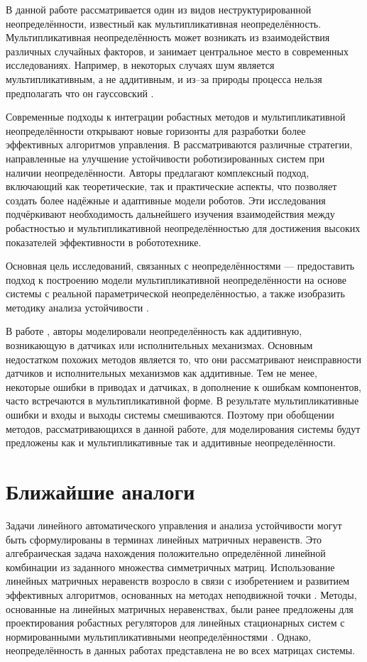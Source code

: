 В данной работе рассматривается один из видов неструктурированной неопределённости, известный как мультипликативная неопределённость. Мультипликативная неопределённость может возникать из взаимодействия различных случайных факторов, и занимает центральное место в современных исследованиях. Например, в некоторых случаях шум является мультипликативным, а не аддитивным, и из--за природы процесса нельзя предполагать что он гауссовский \cite{Bosse2016, Panza2015}.

Современные подходы к интеграции робастных методов и мультипликативной неопределённости открывают новые горизонты для разработки более эффективных алгоритмов управления. В \cite{Radek2017} рассматриваются различные стратегии, направленные на улучшение устойчивости роботизированных систем при наличии неопределённости. Авторы предлагают комплексный подход, включающий как теоретические, так и практические аспекты, что позволяет создать более надёжные и адаптивные модели роботов. Эти исследования подчёркивают необходимость дальнейшего изучения взаимодействия между робастностью и мультипликативной неопределённостью для достижения высоких показателей эффективности в робототехнике.

Основная цель исследований, связанных с неопределённостями --- предоставить подход к построению модели мультипликативной неопределённости на основе системы с реальной параметрической неопределённостью, а также изобразить методику анализа устойчивости \cite{Skogestad2005}.

В работе \cite{Mabrouk2023}, авторы моделировали неопределённость как аддитивную, возникающую в датчиках или исполнительных механизмах. Основным недостатком похожих методов является то, что они рассматривают неисправности датчиков и исполнительных механизмов как аддитивные. Тем не менее, некоторые ошибки в приводах и датчиках, в дополнение к ошибкам компонентов, часто встречаются в мультипликативной форме. В результате мультипликативные ошибки и входы и выходы системы смешиваются. Поэтому при обобщении методов, рассматривающихся в данной работе, для моделирования системы будут предложены как и мультипликативные так и аддитивные неопределённости.
 
\section{Ближайшие аналоги}\label{sec:ch1/sec6}

Задачи линейного автоматического управления и анализа устойчивости могут быть сформулированы в терминах линейных матричных неравенств. Это алгебраическая задача нахождения положительно определённой линейной комбинации из заданного множества симметричных матриц. Использование линейных матричных неравенств возросло в связи с изобретением и развитием эффективных алгоритмов, основанных на методах неподвижной точки \cite{lurie}.
Методы, основанные на линейных матричных неравенствах, были ранее предложены для проектирования робастных регуляторов для линейных стационарных систем с нормированными мультипликативными неопределённостями \cite{POLYAK2021,ROTONDO2014}. Однако, неопределённость в данных работах представлена не во всех матрицах системы.

